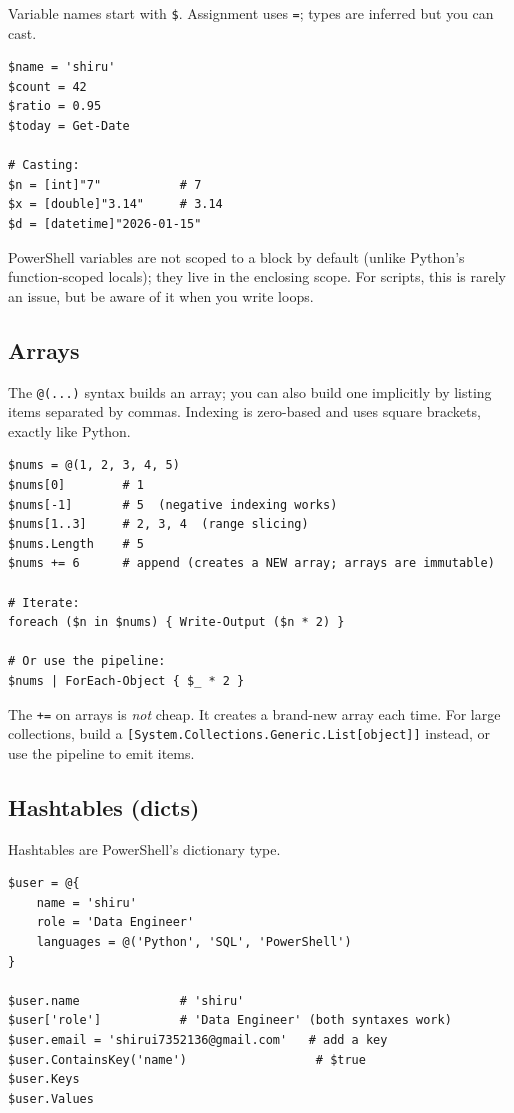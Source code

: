 \documentclass[11pt,a4paper]{article}
\begin{document}
Variable names start with \texttt{\$}. Assignment uses \texttt{=}; types
are inferred but you can cast.

\begin{lstlisting}[style=pwshstyle]
$name = 'shiru'
$count = 42
$ratio = 0.95
$today = Get-Date

# Casting:
$n = [int]"7"           # 7
$x = [double]"3.14"     # 3.14
$d = [datetime]"2026-01-15"
\end{lstlisting}

PowerShell variables are not scoped to a block by default (unlike
Python's function-scoped locals); they live in the enclosing scope.
For scripts, this is rarely an issue, but be aware of it when you
write loops.

\subsection*{Arrays}

The \texttt{@(...)} syntax builds an array; you can also build one
implicitly by listing items separated by commas. Indexing is
zero-based and uses square brackets, exactly like Python.

\begin{lstlisting}[style=pwshstyle]
$nums = @(1, 2, 3, 4, 5)
$nums[0]        # 1
$nums[-1]       # 5  (negative indexing works)
$nums[1..3]     # 2, 3, 4  (range slicing)
$nums.Length    # 5
$nums += 6      # append (creates a NEW array; arrays are immutable)

# Iterate:
foreach ($n in $nums) { Write-Output ($n * 2) }

# Or use the pipeline:
$nums | ForEach-Object { $_ * 2 }
\end{lstlisting}

\begin{gotcha}
The \texttt{+=} on arrays is \emph{not} cheap. It creates a brand-new
array each time. For large collections, build a
\texttt{[System.Collections.Generic.List[object]]} instead, or
use the pipeline to emit items.
\end{gotcha}

\subsection*{Hashtables (dicts)}

Hashtables are PowerShell's dictionary type.

\begin{lstlisting}[style=pwshstyle]
$user = @{
    name = 'shiru'
    role = 'Data Engineer'
    languages = @('Python', 'SQL', 'PowerShell')
}

$user.name              # 'shiru'
$user['role']           # 'Data Engineer' (both syntaxes work)
$user.email = 'shirui7352136@gmail.com'   # add a key
$user.ContainsKey('name')                  # $true
$user.Keys
$user.Values
\end{lstlisting}
\end{document}
